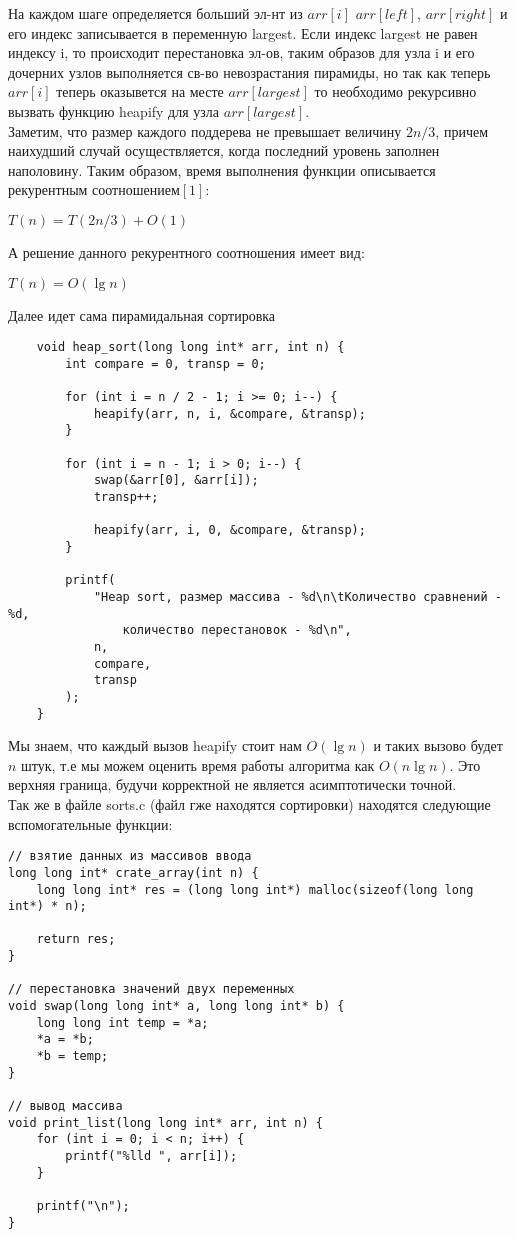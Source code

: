 \documentclass[a4paper,12pt,titlepage,finall]{article}
\begin{document}
На каждом шаге определяется больший эл-нт из $arr[i]$ $arr[left]$, $arr[right]$ и его
индекс записывается в переменную largest. Если индекс largest не равен
индексу i, то происходит перестановка эл-ов, таким образов для 
узла i и его дочерних узлов выполняется св-во невозрастания пирамиды, но так как 
теперь $arr[i]$ теперь оказывется на месте $arr[largest]$ то необходимо
рекурсивно вызвать функцию heapify для узла $arr[largest]$.
\\
Заметим, что размер каждого поддерева не превышает величину $2n/3$, причем наихудший
случай осуществляется, когда последний уровень заполнен наполовину. Таким образом,
время выполнения функции описывается рекурентным соотношением$[1]$: 
\begin{center}
    $T(n) = T(2n/3) + O(1)$
\end{center}

А решение данного рекурентного соотношения имеет вид:
\begin{center}
    $T(n) = O(\lg n)$
\end{center}

Далее идет сама пирамидальная сортировка

\begin{verbatim}
    void heap_sort(long long int* arr, int n) {
        int compare = 0, transp = 0;

        for (int i = n / 2 - 1; i >= 0; i--) {
            heapify(arr, n, i, &compare, &transp);
        }

        for (int i = n - 1; i > 0; i--) {
            swap(&arr[0], &arr[i]);
            transp++;

            heapify(arr, i, 0, &compare, &transp);
        }

        printf(
            "Heap sort, размер массива - %d\n\tКоличество сравнений - %d,
                количество перестановок - %d\n",
            n,
            compare,
            transp
        );
    }
\end{verbatim}

Мы знаем, что каждый вызов heapify стоит нам $O(\lg n)$ и таких вызово будет
$n$ штук, т.е мы можем оценить время работы алгоритма как $O(n\lg n)$. Это верхняя граница, будучи корректной
не является асимптотически точной.
\\

Так же в файле sorts.c (файл гже находятся сортировки) находятся следующие вспомогательные функции:

\begin{verbatim}
// взятие данных из массивов ввода
long long int* crate_array(int n) {
    long long int* res = (long long int*) malloc(sizeof(long long int*) * n);

    return res;
}

// перестановка значений двух переменных
void swap(long long int* a, long long int* b) {
    long long int temp = *a;
    *a = *b;
    *b = temp;
}

// вывод массива
void print_list(long long int* arr, int n) {
    for (int i = 0; i < n; i++) {
        printf("%lld ", arr[i]);
    }

    printf("\n");
}
\end{verbatim}
\end{document}
